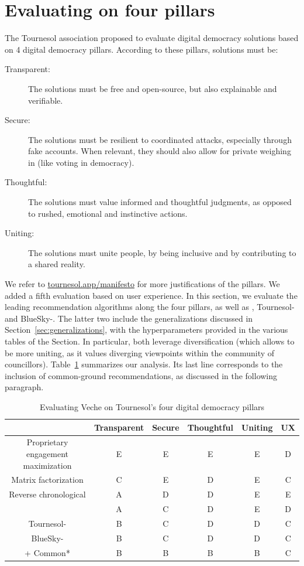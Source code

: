 \section{Evaluating \Veche{} on four pillars}
\label{sec:evaluation}

The Tournesol association proposed to evaluate digital democracy solutions
based on 4 digital democracy pillars.
According to these pillars, solutions must be:
\begin{description}
    \item[Transparent:] The solutions must be free and open-source,
    but also explainable and verifiable.
    \item[Secure:] The solutions must be resilient to coordinated attacks,
    especially through fake accounts. 
    When relevant, they should also allow for private weighing in
    (like voting in democracy).
    \item[Thoughtful:] The solutions must value informed and thoughtful judgments,
    as opposed to rushed, emotional and instinctive actions.
    \item[Uniting:] The solutions must unite people,
    by being inclusive and by contributing to a shared reality.
\end{description}
We refer to \url{tournesol.app/manifesto} for more justifications of the pillars.
We added a fifth evaluation based on user experience.
In this section, 
we evaluate the leading recommendation algorithms along the four pillars,
as well as \SimpleVeche{}, Tournesol-\Veche{} and BlueSky-\Veche{}.
The latter two include the generalizations discussed in Section~\ref{sec:generalizations},
with the hyperparameters provided in the various tables of the Section.
In particular, both leverage diversification
(which allows to be more uniting, 
as it values diverging viewpoints within the community of councillors).
Table~\ref{table:pillars} summarizes our analysis.
Its last line corresponds to the inclusion of common-ground recommendations,
as discussed in the following paragraph.

\begin{table}
    \centering
    \begin{tabular}{|c|c|c|c|c|c|}
        \hline
        & Transparent & Secure & Thoughtful & Uniting & UX \\ \hline
        Proprietary engagement maximization  & E & E & E & E & D \\ \hline
        Matrix factorization   & C & E & D & E & C \\ \hline
        Reverse chronological  & A & D & D & E & E \\ \hline
        \SimpleVeche{}         & A & C & D & E & D \\ \hline
        Tournesol-\Veche{}     & B & C & D & D & C \\ \hline
        BlueSky-\Veche{}       & B & C & D & D & C \\ \hline
        \Veche{} + Common*     & B & B & B & B & C \\ \hline
    \end{tabular}
    \caption{Evaluating Veche on Tournesol's four digital democracy pillars}
    \label{table:pillars}
\end{table}

